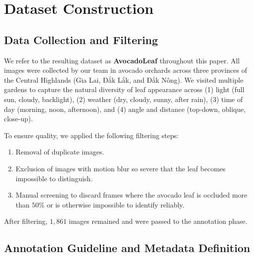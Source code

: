 \section{Dataset Construction}
\label{sec:dataset_construction}
\subsection{Data Collection and Filtering}
\label{subsec:data_collection}

We refer to the resulting dataset as \textbf{AvocadoLeaf} throughout this paper. All images were collected by our team in avocado orchards across three provinces of the Central Highlands (Gia Lai, Đắk Lắk, and Đắk Nông). We visited multiple gardens to capture the natural diversity of leaf appearance across (1) light (full sun, cloudy, backlight), (2) weather (dry, cloudy, sunny, after rain), (3) time of day (morning, noon, afternoon), and (4) angle and distance (top-down, oblique, close-up).

To ensure quality, we applied the following filtering steps:
\begin{enumerate}
    \item[(1)] Removal of duplicate images.
    \item[(2)] Exclusion of images with motion blur so severe that the leaf becomes impossible to distinguish.
    \item[(3)] Manual screening to discard frames where the avocado leaf is occluded more than $50\%$ or is otherwise impossible to identify reliably.
\end{enumerate}
After filtering, $1,861$ images remained and were passed to the annotation phase.


\subsection{Annotation Guideline and Metadata Definition}
\label{subsec:annotation_guideline}

